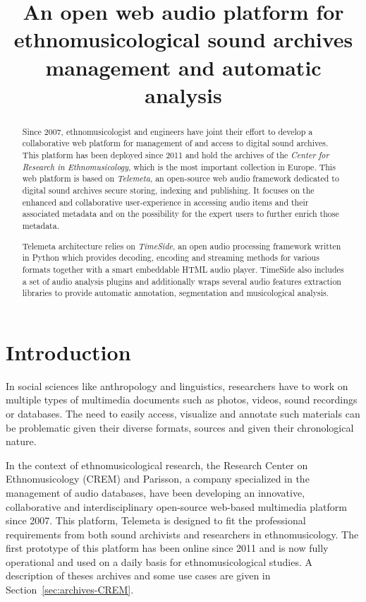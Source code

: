\documentclass{paper}
\title{An open web audio platform for ethnomusicological sound archives management and automatic analysis}
\begin{document}
%
\maketitle
%
\begin{abstract}
Since 2007, ethnomusicologist and engineers have joint their effort to develop a collaborative web platform for management of and access to digital sound archives. This platform has been deployed since 2011 and hold the archives of the \emph{Center for Research in Ethnomusicology}, which is the most important collection in Europe.
This web platform is based on \emph{Telemeta}, an open-source web audio framework dedicated to digital sound archives secure storing, indexing and publishing. It focuses on the enhanced and collaborative user-experience in accessing audio items and their associated metadata and on the possibility for the expert users to further enrich those metadata.

 Telemeta architecture relies on \emph{TimeSide}, an open audio processing framework written in Python which provides decoding,  encoding and streaming methods for various formats together with a smart embeddable HTML audio player. TimeSide also includes a set of audio analysis plugins and additionally wraps several audio features extraction libraries to provide automatic annotation, segmentation and musicological analysis.

\end{abstract}

\section{Introduction}\label{sec:intro}

 In social sciences like anthropology and linguistics, researchers have to work on multiple types of multimedia documents such as photos, videos, sound recordings or databases. The need to easily access, visualize and annotate such materials can be problematic given their diverse formats, sources and given their chronological nature.

  In the context of ethnomusicological research, the Research Center on Ethnomusicology (CREM) and Parisson, a company specialized in the management of audio databases, have been developing an innovative, collaborative and interdisciplinary open-source web-based multimedia platform since 2007. 
This platform, Telemeta is designed to fit the professional requirements from both sound archivists and researchers in ethnomusicology. The first prototype of this platform has been online since 2011 and is now fully operational and used on a daily basis for ethnomusicological studies. A description of theses archives and some use cases are given in Section~\ref{sec:archives-CREM}.
\end{document}
